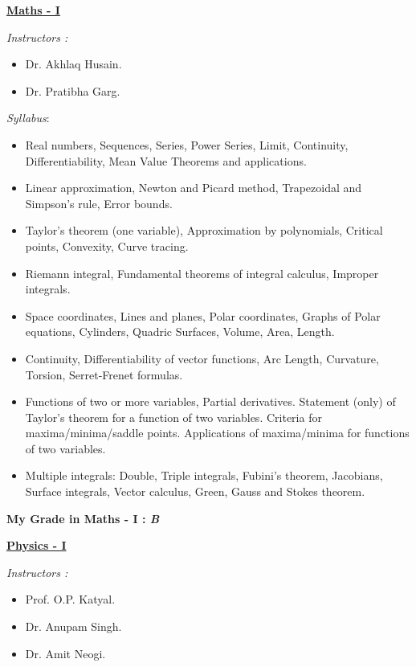\documentclass{report}
\begin{document}
\pagebreak
\begin{center}\huge{\bf \underline{Maths - I}}\end{center}\vspace{.3in}
\large \emph{Instructors :}\vspace{.05in}
\begin{itemize}
\item Dr. Akhlaq Husain.
\item Dr. Pratibha Garg.
\end{itemize}
\vspace{.1in}
\emph{Syllabus}:\vspace{.05in}
\begin{itemize}
\item Real numbers, Sequences, Series, Power Series, Limit, Continuity, Differentiability, Mean Value Theorems and applications.
\item Linear approximation, Newton and Picard method, Trapezoidal and Simpson's rule, Error bounds.
\item Taylor's theorem (one variable), Approximation by polynomials, Critical points, Convexity, Curve tracing.
\item Riemann integral, Fundamental theorems of integral calculus, Improper integrals.
\item Space coordinates, Lines and planes, Polar coordinates, Graphs of Polar equations, Cylinders, Quadric Surfaces, Volume, Area, Length.
\item Continuity, Differentiability of vector functions, Arc Length, Curvature, Torsion, Serret‐Frenet formulas.
\item Functions of two or more variables, Partial derivatives. Statement (only) of Taylor's theorem for a function of two variables. Criteria for maxima/minima/saddle points. Applications of maxima/minima for functions of two variables.
\item Multiple integrals: Double, Triple integrals, Fubini's theorem, Jacobians, Surface integrals, Vector calculus, Green, Gauss and Stokes theorem.
\end{itemize}
\vspace{.3in}
\Large{\bf My Grade in Maths - I : \emph{B}}
\pagebreak
\begin{center}\huge{\bf \underline{Physics - I}}\end{center}\vspace{.3in}
\large \emph{Instructors :}\vspace{.05in}
\begin{itemize}
\item Prof. O.P. Katyal.
\item Dr. Anupam Singh.
\item Dr. Amit Neogi.
\end{itemize}
\end{document}
